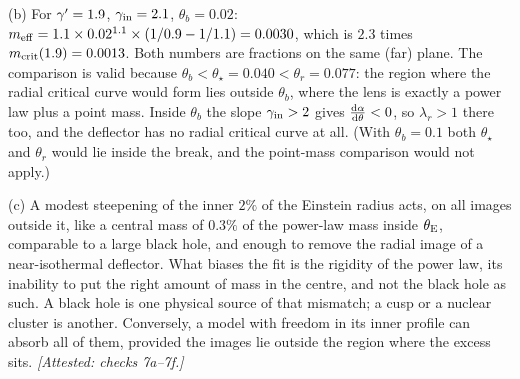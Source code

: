 (b) For $\gamma'=1.9$, $\gamma_{\rm in}=2.1$, $\theta_b=0.02$:
$m_{\rm eff}=1.1\times0.02^{1.1}\times(1/0.9-1/1.1)=0.0030$, which is
$2.3$ times $m_{\rm crit}(1.9)=0.0013$. Both numbers are fractions on
the same (far) plane. The comparison is valid because
$\theta_b<\theta_\star=0.040<\theta_r=0.077$: the region where the
radial critical curve would form lies outside $\theta_b$, where the lens
is exactly a power law plus a point mass. Inside $\theta_b$ the slope
$\gamma_{\rm in}>2$ gives $\frac{\mathrm{d} \alpha}{\mathrm{d} \theta}<0$, so $\lambda_r>1$
there too, and the deflector has no radial critical curve at all.
(With $\theta_b=0.1$ both $\theta_\star$ and $\theta_r$ would lie
inside the break, and the point-mass comparison would not apply.)

(c) A modest steepening of the inner $2\%$ of the Einstein
radius acts, on all images outside it, like a central mass of $0.3\%$
of the power-law mass inside $\theta_{\mathrm{E}}$, comparable to a large black
hole, and enough to remove the radial image of a near-isothermal
deflector. What biases the fit is the
rigidity of the power law, its inability to put the right amount
of mass in the centre, and not the black hole as such. A black hole is
one physical source of that mismatch; a cusp or a nuclear cluster is
another. Conversely, a model with freedom in its inner profile can
absorb all of them, provided the images lie outside the region where the
excess sits.
\emph{[Attested: checks 7a--7f.]}
